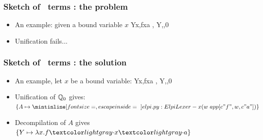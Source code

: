 \documentclass{pres}
\begin{document}
\begin{frame}[fragile]
  \frametitle{Sketch of \maybebeta\ terms : the problem}

  \def\var{Y}

  \begin{itemize}
    \item An example: given a bound variable $x$
      \printAlllSingle
      {{{\var\appsep x,f\appsep x\appsep a}}}
      {{{,}}}
      {{{\var,,0}}}
      {{}}
    \item Unification fails...
  \end{itemize}

\end{frame}

\begin{frame}[fragile]
  \frametitle{Sketch of \maybebeta\ terms : the solution}

  \def\var{Y}

  \begin{itemize}
    \item An example, let $x$ be a bound variable: 
      \printAlllSingle
      {{{\var\appsep x,f\appsep x\appsep a}}}
      {{{,}}}
      {{{\var,,0}}}
      {{}}
    \item Unification of $\mathbb{Q}_0$ gives: $\{A \mapsto \elpiIn{(w\ app[c"f", w, c"a"])}\}$
    \item Decompilation of $A$ gives $\{\var \mapsto \lambda x.f\appsep x\appsep a\}$
  \end{itemize}

\end{frame}
\end{document}

